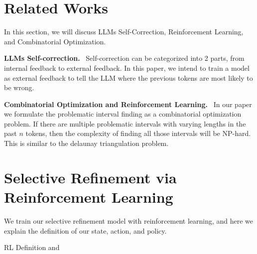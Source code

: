 \section{Related Works}

In this section, we will discuss LLMs Self-Correction, Reinforcement Learning, and Combinatorial Optimization. 

\textbf{LLMs Self-correction.} \ Self-correction can be categorized into 2 parts, from internal feedback to external feedback. In this paper, we intend to train a model as external feedback to tell the LLM where the previous tokens are most likely to be wrong. 

\textbf{Combinatorial Optimization and Reinforcement Learning.} \ In our paper we formulate the problematic interval finding as a combinatorial optimization problem. If there are multiple problematic intervals with varying lengths in the past $n$ tokens, then the complexity of finding all those intervals will be NP-hard. This is similar to the delaunay triangulation problem. 

\section{Selective Refinement via Reinforcement Learning}

We train our selective refinement model with reinforcement learning, and here we explain the definition of our state, action, and policy.

RL Definition and  